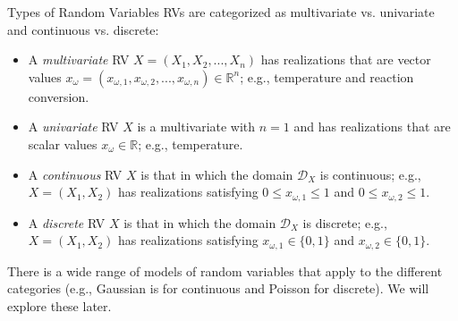 \documentclass[9pt]{beamer}
\begin{document}
\begin{frame}{Types of Random Variables}
RVs are categorized as multivariate vs. univariate and continuous vs. discrete:

\begin{block}{}
\begin{itemize}
\item A {\em multivariate} RV $X=(X_{1},X_{2},...,X_n)$ has realizations that are vector values $x_{\omega}=(x_{\omega,1},x_{\omega,2},...,x_{\omega,n})\in \mathbb{R}^n$; e.g., temperature and reaction conversion.
\item A {\em univariate} RV $X$ is a multivariate with $n=1$ and has realizations that are scalar values $x_\omega\in \mathbb{R}$; e.g., temperature.
\item A {\em continuous} RV $X$ is that in which the domain $\mathcal{D}_X$ is continuous; e.g., $X=(X_1,X_2)$ has realizations satisfying $0\leq x_{\omega,1}\leq 1$ and $0\leq x_{\omega,2}\leq 1$.
\item A {\em discrete} RV $X$ is that in which the domain $\mathcal{D}_X$ is discrete; e.g., $X=(X_1,X_2)$ has realizations satisfying $x_{\omega,1}\in \{0,1\}$ and $x_{\omega,2}\in \{0,1\}$.
\end{itemize}
\end{block}
There is a wide range of models of random variables that apply to the different categories (e.g., Gaussian is for continuous and Poisson for discrete). We will explore these later.  
\end{frame}
\end{document}
